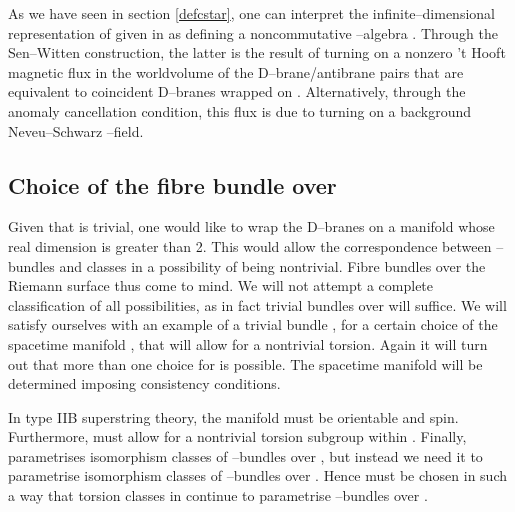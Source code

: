 \documentclass[a4paper,a4paper]{article}
\begin{document}
As we have seen in section \ref{defcstar}, one can interpret the infinite--dimensional 
representation of \coordHE{} given in \cite{PROCEEDINGS} as defining a
noncommutative \coordHE{}--algebra \coordHE{}. Through the 
Sen--Witten construction, the latter is the result of turning on a nonzero 't Hooft 
magnetic flux in the worldvolume of the \coordHE{} D\coordHE{}--brane/antibrane pairs 
that are equivalent to \coordHE{} coincident D\coordHE{}--branes wrapped on \myHighlight{$\Sigma$}\coordHE{}. 
Alternatively, through the anomaly cancellation condition, this flux is due to 
turning on a background Neveu--Schwarz \coordHE{}--field.  

\subsection{Choice of the fibre bundle over \myHighlight{$\Sigma$}\coordHE{}}\label{manifoldy}

Given that \coordHE{} is trivial, one would like to wrap the D\coordHE{}--branes 
on a manifold whose real dimension is greater than 2. This would allow the
correspondence between \coordHE{}--bundles and classes in \coordHE{}
a possibility of being nontrivial. Fibre bundles over the Riemann surface \myHighlight{$\Sigma$}\coordHE{} thus come 
to mind. We will not attempt a complete classification of all 
possibilities, as in fact trivial bundles over \myHighlight{$\Sigma$}\coordHE{} will suffice.
We will satisfy ourselves with an example of a trivial bundle
\coordHE{}, for a certain choice of the spacetime manifold \coordHE{},
that will allow for a nontrivial torsion. Again it will turn out that more 
than one choice for \coordHE{} is possible. The spacetime manifold \coordHE{} will be determined 
imposing consistency conditions. 

In type IIB superstring theory, the manifold \coordHE{} must be orientable
and spin. Furthermore, \coordHE{} must allow for a nontrivial 
torsion subgroup within \coordHE{}. Finally, \coordHE{} 
parametrises isomorphism classes of \coordHE{}--bundles over \coordHE{}, 
but instead we need it to parametrise isomorphism classes of 
\coordHE{}--bundles over \myHighlight{$\Sigma$}\coordHE{}. Hence \coordHE{} must be chosen 
in such a way that torsion classes in \coordHE{} 
continue to parametrise \coordHE{}--bundles over \myHighlight{$\Sigma$}\coordHE{}.
\end{document}
